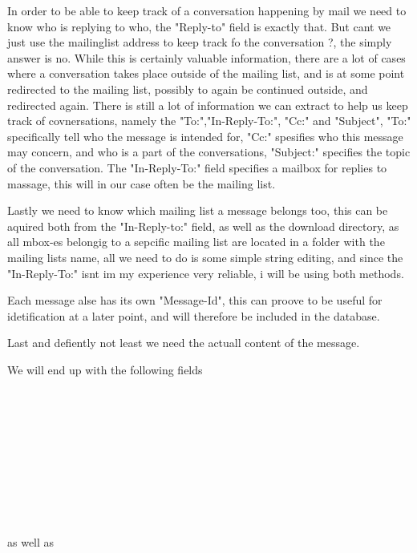 \documentclass{report}
\begin{document}
In order to be able to keep track of a conversation happening by mail we need to know who is replying to who, the "Reply-to" field is exactly that. But cant we just use the mailinglist 
address to keep track fo the conversation ?, the simply answer is no. While this is certainly valuable information, there are a lot of cases where a conversation takes place outside of the mailing list, and is at some point redirected to the mailing list, possibly to again be continued outside, and redirected again.
There is still a lot of information we can extract to help us keep track of covnersations, namely the "To:","In-Reply-To:", "Cc:" and "Subject", "To:" specifically tell who the message is intended for, "Cc:" spesifies who this message may concern, and who is a part of the conversations,  "Subject:" specifies the topic of the conversation. 
The "In-Reply-To:" field specifies a mailbox for replies to massage, this will in our case often be the mailing list.

Lastly we need to know which mailing list a message belongs too, this can be aquired both from the "In-Reply-to:" field, as well as the download directory, as all mbox-es belongig to a sepcific mailing list are located in a folder with the mailing lists name, all we need to do is some simple string editing, and since the "In-Reply-To:" isnt im my experience very reliable, i will be using both 
methods.

Each message alse has its own "Message-Id", this can proove to be useful for idetification at a later point, and will therefore be included in the database.

Last and defiently not least we need the actuall content of the message.

We will end up with the following fields 
\\
\\
\\
\\
\\
\\
\\
\\
\\
\\
\\

as well as\\
 
\\
\\
\end{document}
